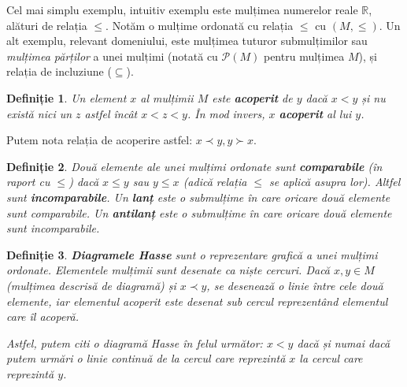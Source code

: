 \documentclass[12pt, a4paper, twoside, romanian]{teza-upb}
\newtheorem{defn}{Definiție}
\begin{document}
    Cel mai simplu exemplu, intuitiv exemplu este mulțimea numerelor reale $ \mathbb{R}$, alături de relația $\le$. Notăm o mulțime ordonată cu relația $\le$ cu $(M, \le)$. Un alt exemplu, relevant domeniului, este mulțimea tuturor submulțimilor sau \textit{mulțimea părților} a unei mulțimi (notată cu $\mathcal{P}(M)$ pentru mulțimea $M$), și relația de incluziune ($\subseteq$).

    \begin{defn}
      Un element $x$ al mulțimii $M$ este \textbf{acoperit} de $y$ dacă $x < y$ și nu există nici un $z$ astfel încât $x < z < y$. În mod invers, $x$ \textbf{acoperit} al lui $y$.
    \end{defn}

    Putem nota relația de acoperire astfel: $x \prec y, y \succ x$.

    \begin{defn}
      Două elemente ale unei mulțimi ordonate sunt \textbf{comparabile} (în raport cu $\le$) dacă $x \le y$ sau $y \le x$ (adică relația $\le$ se aplică asupra lor). Altfel sunt \textbf{incomparabile}. Un \textbf{lanț} este o submulțime în care oricare două elemente sunt comparabile. Un \textbf{antilanț} este o submulțime în care oricare două elemente sunt incomparabile.
    \end{defn}

    \begin{defn}
      \label{defn:hasse}
      \textbf{Diagramele Hasse} sunt o reprezentare grafică a unei mulțimi ordonate. Elementele mulțimii sunt desenate ca niște cercuri. Dacă $x, y \in M$ (mulțimea descrisă de diagramă) și $x \prec y$, se desenează o linie între cele două elemente, iar elementul acoperit este desenat sub cercul reprezentând elementul care îl acoperă.

      Astfel, putem citi o diagramă Hasse în felul următor: $x < y$ dacă și numai dacă putem urmări o linie continuă de la cercul care reprezintă $x$ la cercul care reprezintă $y$.
    \end{defn}
\end{document}
